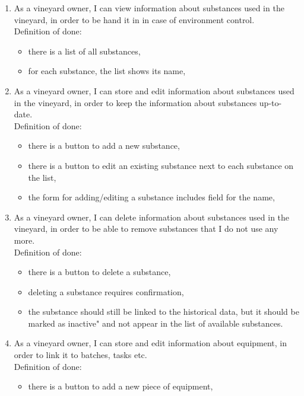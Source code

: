 \begin{enumerate}
	\item As a vineyard owner, I can view information about substances used in the vineyard, in order to be hand it in in case of environment control.
	\\Definition of done:
		\begin{itemize}
		\item there is a list of all substances,
		\item for each substance, the list shows its name,
	\end{itemize}
	\item As a vineyard owner, I can store and edit information about substances used in the vineyard, in order to keep the information about substances up-to-date.
	\\Definition of done:
	\begin{itemize}
		\item there is a button to add a new substance,
		\item there is a button to edit an existing substance next to each substance on the list,
		\item the form for adding/editing a substance includes field for the name,
	\end{itemize}
	\item As a vineyard owner, I can delete information about substances used in the vineyard, in order to be able to remove substances that I do not use any more.
	\\Definition of done:
	\begin{itemize}
		\item there is a button to delete a substance,
		\item deleting a substance requires confirmation,
		\item the substance should still be linked to the historical data, but it should be marked as inactive" and not appear in the list of available substances.
	\end{itemize}
	\item As a vineyard owner, I can store and edit information about equipment, in order to link it to batches, tasks etc.
	\\Definition of done:
	\begin{itemize}
		\item there is a button to add a new piece of equipment,

\end{itemize}
\end{enumerate}
